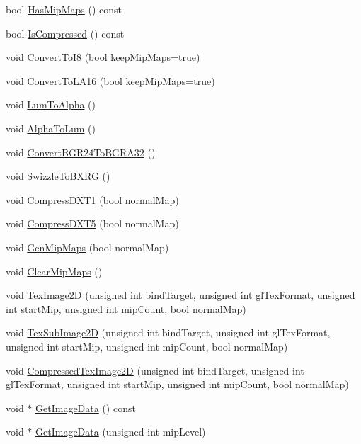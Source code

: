 \begin{CompactItemize}
\begin{CompactItemize}
\item 
bool \hyperlink{class_gr_image_af38daff1672308197b7155c1d4fb2e3}{HasMipMaps} () const 
\item 
bool \hyperlink{class_gr_image_f56a1347e57f10348427f26a873e6626}{IsCompressed} () const 
\item 
void \hyperlink{class_gr_image_3e3182e9acf5bd5b9c93364a260823a1}{ConvertToI8} (bool keepMipMaps=true)
\item 
void \hyperlink{class_gr_image_f47bb843809a5cba9433c78887dc86b5}{ConvertToLA16} (bool keepMipMaps=true)
\item 
void \hyperlink{class_gr_image_505dfff967ff222a0bfac1bc24e4c6bd}{LumToAlpha} ()
\item 
void \hyperlink{class_gr_image_0a187b271d32fc3aa75a147b6e9e691b}{AlphaToLum} ()
\item 
void \hyperlink{class_gr_image_9529693888abcb6afa1831800d70274c}{ConvertBGR24ToBGRA32} ()
\item 
void \hyperlink{class_gr_image_65b8e5612f49397249c0d502ac451712}{SwizzleToBXRG} ()
\item 
void \hyperlink{class_gr_image_de98dd0d8da1c4ff3a4cd3d2b248ce68}{CompressDXT1} (bool normalMap)
\item 
void \hyperlink{class_gr_image_688d884b98edfbeb204fa3231c71c357}{CompressDXT5} (bool normalMap)
\item 
void \hyperlink{class_gr_image_7e0b6426aaba56cdda4ae76cd394d863}{GenMipMaps} (bool normalMap)
\item 
void \hyperlink{class_gr_image_af7a1554288af6dc8a5ef14aed1c6162}{ClearMipMaps} ()
\item 
void \hyperlink{class_gr_image_e405a9f4a875593784f7282a290c69ab}{TexImage2D} (unsigned int bindTarget, unsigned int glTexFormat, unsigned int startMip, unsigned int mipCount, bool normalMap)
\item 
void \hyperlink{class_gr_image_31668f20cc842a53d078f81731d7466b}{TexSubImage2D} (unsigned int bindTarget, unsigned int glTexFormat, unsigned int startMip, unsigned int mipCount, bool normalMap)
\item 
void \hyperlink{class_gr_image_0b346c74770977c9ec085152dcf4153e}{CompressedTexImage2D} (unsigned int bindTarget, unsigned int glTexFormat, unsigned int startMip, unsigned int mipCount, bool normalMap)
\item 
void $\ast$ \hyperlink{class_gr_image_2bdbae66e962b141e9b0509fa5d0baf5}{GetImageData} () const 
\item 
void $\ast$ \hyperlink{class_gr_image_00e8787cde46c9cb3c994cf365570094}{GetImageData} (unsigned int mipLevel)
\end{CompactItemize}



\end{CompactItemize}
